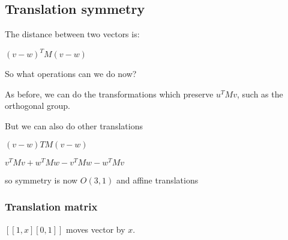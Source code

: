 
\subsection{Translation symmetry}

The distance between two vectors is:

\((v-w)^TM(v-w)\)

So what operations can we do now?

As before, we can do the transformations which preserve \(u^TMv\), such as the orthogonal group.

But we can also do other translations

\((v-w)TM(v-w)\)

\(v^TMv+w^TMw-v^TMw-w^TMv\)

so symmetry is now \(O(3,1)\) and affine translations

\subsubsection{Translation matrix}

\([[1,x][0, 1]]\) moves vector by \(x\).


